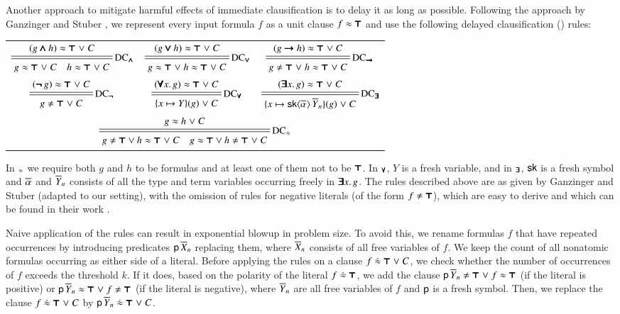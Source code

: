 Another approach to mitigate harmful effects of immediate clausification
is to delay it as long as possible. Following the approach by 
Ganzinger and Stuber \cite{gs-05-boolsup}, we represent every input formula $f$ as a unit clause $f \approx \pmb{\top}$ and use the following
delayed clausification () rules:

\vspace{2\jot}
\begin{tabular}{ccc}
  $\namedsimp{DC$_{\iand}$}
  { (g \iand h) \eq \itrue \llor C}
  { g \eq \itrue \llor C \quad h \eq \itrue \llor C }$ &
  $\namedsimp{DC$_{\ior}$}
  { (g \ior h) \eq \itrue \llor C}
  { g \eq \itrue \llor h \eq \itrue  \llor C }$ &
  $\namedsimp{DC$_{\iimplies}$}
  { (g\iimplies h) \eq \itrue \llor C}
  { g\not\eq \itrue \llor h \eq \itrue  \llor C } $ \\[2\jot]
  $\namedsimp{DC$_{\inot}$}
  { (\inot g) \eq \itrue \llor C}
  { g\not\eq \itrue \llor C}$ &
  $\namedsimp{DC$_{\iforall}$}
  { (\iforall x. \, g) \eq \itrue \llor C}
  { \{x \mapsto Y\}(g) \llor C }$ &
  $\namedsimp{DC$_{\iexists}$}
  { (\iexists x.\, g) \eq \itrue \llor C}
  { \{x \mapsto \cst{sk}\typeargs{\tuple{\alpha}{}} \, \tuplen{Y} \}(g) \llor C }$ 
  \\[2\jot]
  \multicolumn{3}{c}{$\namedsimp{DC$_\eq$}
  { g\eq h \llor C}
  { g\not\eq \itrue \lor h\eq\itrue \llor C \quad g \eq \itrue \lor h\not\eq\itrue \llor C}$}
\end{tabular}
\vspace{2\jot}

In $_\approx$ we require both $g$ and $h$ to be formulas and at least one of
them not to be $\pmb{\top}$. In $_{\pmb{\forall}}$, $Y$ is a fresh variable, and in
$_{\pmb{\exists}}$, $\mathsf{sk}$ is a fresh symbol and $\overline{\alpha}_{}$ and $\overline{Y}_{n}$ consists of all the type and term variables occurring
freely in $\pmb{\exists} x.\, g$. The rules described above are as given by Ganzinger and Stuber (adapted to
our setting), with the omission of rules for negative literals (of the form $ f \not\eq
\itrue$), which are easy to derive and which can be found in their work \cite{gs-05-boolsup}.

Naive application of the  rules can result in exponential blowup in
problem size. To avoid this, we rename formulas $f$ that have repeated
occurrences by introducing predicates $\mathsf{p} \, \overline{X}_{n}$ replacing them, where
$\overline{X}_{n}$ consists of all free variables of $f$. We keep the count of all nonatomic
formulas occurring as either side of a literal. Before applying the 
rules on a clause $f \mathrel{\dot{\approx}} \pmb{\top} \mathrel\lor C $, we check whether the
number of occurrences of $f$  exceeds the threshold $k$. If it does, based on the
polarity of the literal $f \mathrel{\dot{\approx}} \pmb{\top}$, we add the clause
$\cst{p} \, \tuplen{Y} \not\eq \itrue \llor f \eq \itrue$ (if the literal is
positive) or $\cst{p} \, \tuplen{Y} \eq \itrue \llor f \not\eq \itrue$ (if the
literal is negative), where $\overline{Y}_{n}$ are all free variables of $f$ and
$\mathsf{p}$ is a fresh symbol. Then, we replace the clause $f \mathrel{\dot{\approx}}
\pmb{\top} \mathrel\lor C$ by $ \mathsf{p} \, \overline{Y}_{n} \mathrel{\dot{\approx}} \pmb{\top} \mathrel\lor C$.


